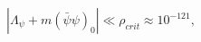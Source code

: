 \begin{equation} \label{eq:c1}
|\Lambda_\psi+m(\bar{\psi}{\psi})_0|\ll \rho_{crit}\approx 10^{-121},
\end{equation}

